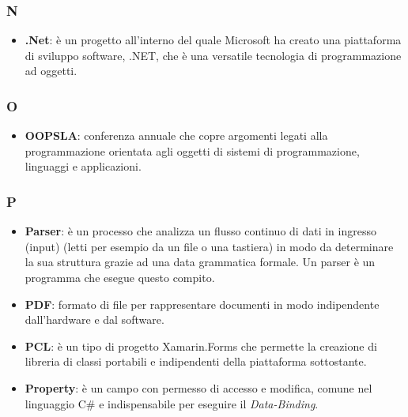 \subsubsection{N}
\begin{itemize}
	\item \textbf{.Net}: è un progetto all'interno del quale Microsoft ha creato una piattaforma di sviluppo software, .NET, che è una versatile tecnologia di programmazione ad oggetti.
\end{itemize}

\subsubsection{O}
\begin{itemize}
	\item \textbf{OOPSLA}: conferenza annuale che copre argomenti legati alla programmazione orientata agli oggetti di sistemi di programmazione, linguaggi e applicazioni.
\end{itemize}

\subsubsection{P}
\begin{itemize}
	\item \textbf{Parser}: è un processo che analizza un flusso continuo di dati in ingresso (input) (letti per esempio da un file o una tastiera) in modo da determinare la sua struttura grazie ad una data grammatica formale. Un parser è un programma che esegue questo compito.
	\item \textbf{PDF}: formato di file per rappresentare documenti in modo indipendente dall'hardware e dal software.
	\item \textbf{PCL}: è un tipo di progetto Xamarin.Forms che permette la creazione di libreria di classi portabili e indipendenti della piattaforma sottostante.
	\item \textbf{Property}: è un campo con permesso di accesso e modifica, comune nel linguaggio C\# e indispensabile per eseguire il \textit{Data-Binding}.
\end{itemize}

